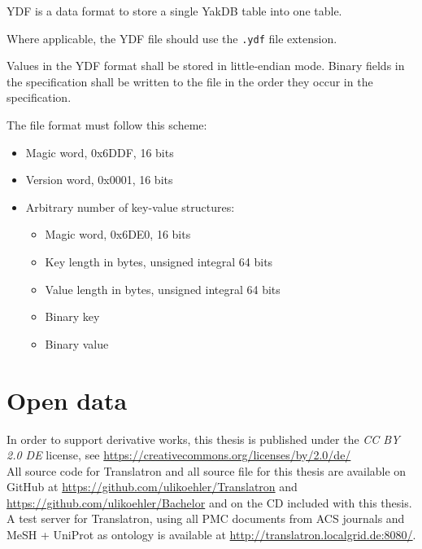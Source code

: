 \documentclass[a4paper, 12pt, twoside, reqn]{report}
\numberwithin{figure}{chapter}
\newtheorem[L]{boxedDefinition}{Definition}
\newtheorem[L]{boxedExample}{Example}
\begin{document}
\enlargethispage{2\baselineskip}
{\setlength{\parindent}{0cm} 
YDF is a data format to store a single YakDB table into
one table.

Where applicable, the YDF file should use the \texttt{.ydf} file extension.

Values in the YDF format shall be stored in little-endian mode.
Binary fields in the specification shall be written to the file in the order they occur in
the specification.
}
The file format must follow this scheme:
\begin{itemize}
  \item Magic word, 0x6DDF, 16 bits
  \item Version word, 0x0001, 16 bits
 \item Arbitrary number of key-value structures:
 \begin{itemize}
  \item Magic word, 0x6DE0, 16 bits
  \item Key length in bytes, unsigned integral 64 bits
  \item Value length in bytes, unsigned integral 64 bits
  \item Binary key
  \item Binary value
 \end{itemize}

\end{itemize}

\chapter{Open data}\label{appendix:opendata}

In order to support derivative works, this thesis is published under the \textit{CC BY 2.0 DE} license, see \url{https://creativecommons.org/licenses/by/2.0/de/}\\[2cm]

{\setlength{\parindent}{0cm} All source code for Translatron and all source file for this thesis are available on GitHub at \url{https://github.com/ulikoehler/Translatron} and \url{https://github.com/ulikoehler/Bachelor} and on the CD included with this thesis.}\\

{\setlength{\parindent}{0cm} A test server for Translatron, using all PMC documents from ACS journals and MeSH + UniProt as ontology is available at \url{http://translatron.localgrid.de:8080/}. }
\end{document}

